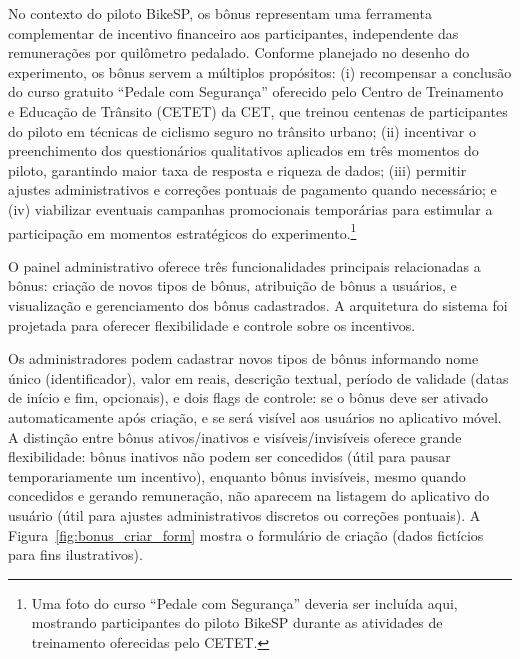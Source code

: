 

No contexto do piloto BikeSP, os bônus
representam uma ferramenta complementar de incentivo financeiro aos participantes,
independente das remunerações por quilômetro pedalado. Conforme planejado no desenho
do experimento, os bônus servem a múltiplos propósitos: (i) recompensar a conclusão
do curso gratuito ``Pedale com Segurança'' oferecido pelo Centro de Treinamento e
Educação de Trânsito (CETET) da CET, que treinou centenas de participantes do piloto em técnicas de ciclismo seguro no trânsito urbano; (ii) incentivar o preenchimento dos
questionários qualitativos aplicados em três momentos do piloto, garantindo maior
taxa de resposta e riqueza de dados; (iii) permitir ajustes administrativos e
correções pontuais de pagamento quando necessário; e (iv) viabilizar eventuais
campanhas promocionais temporárias para estimular a participação em momentos
estratégicos do experimento.\footnote{Uma foto do curso ``Pedale com Segurança'' deveria ser incluída aqui, mostrando participantes do piloto BikeSP durante as atividades de treinamento oferecidas pelo CETET.}

O painel administrativo oferece três
funcionalidades principais relacionadas a bônus: criação de novos tipos de bônus,
atribuição de bônus a usuários, e visualização e gerenciamento dos bônus
cadastrados. A arquitetura do sistema foi projetada para oferecer flexibilidade e controle sobre os incentivos.

Os administradores podem cadastrar novos tipos de bônus
informando nome único (identificador), valor em reais, descrição textual, período
de validade (datas de início e fim, opcionais), e dois flags de controle: se o
bônus deve ser ativado automaticamente após criação, e se será visível aos
usuários no aplicativo móvel. A distinção entre bônus ativos/inativos e
visíveis/invisíveis oferece grande flexibilidade: bônus inativos não podem ser
concedidos (útil para pausar temporariamente um incentivo), enquanto bônus
invisíveis, mesmo quando concedidos e gerando remuneração, não aparecem na
listagem do aplicativo do usuário (útil para ajustes administrativos discretos ou
correções pontuais). A Figura~\ref{fig:bonus_criar_form} mostra o formulário de criação (dados fictícios para fins ilustrativos).

